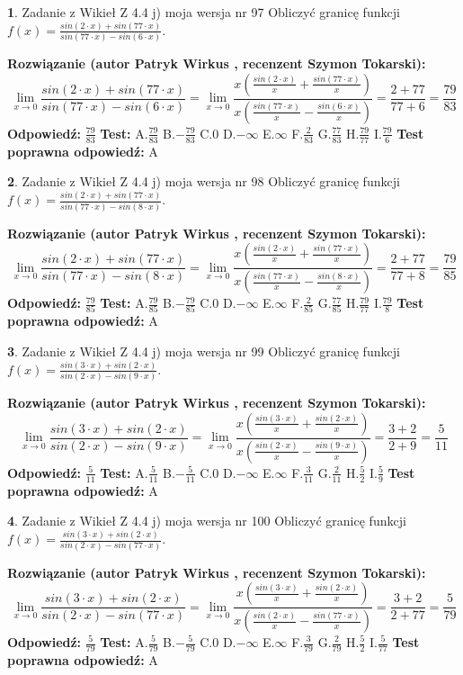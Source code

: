 \documentclass[12pt, a4paper]{article}
\theoremstyle{definition} %
\newtheorem{zad}{}
\newcommand{\zadStart}[1]{\begin{zad}#1\newline}
\newcommand{\zadStop}{\end{zad}}
\newcommand{\rozwStart}[2]{\noindent \textbf{Rozwiązanie (autor #1 , recenzent #2): }\newline}
\newcommand{\rozwStop}{\newline}
\newcommand{\odpStart}{\noindent \textbf{Odpowiedź:}\newline}
\newcommand{\odpStop}{\newline}
\newcommand{\testStart}{\noindent \textbf{Test:}\newline}
\newcommand{\testStop}{\newline}
\newcommand{\kluczStart}{\noindent \textbf{Test poprawna odpowiedź:}\newline}
\newcommand{\kluczStop}{\newline}
\begin{document}
\zadStart{Zadanie z Wikieł Z 4.4 j) moja wersja nr 97}
Obliczyć granicę funkcji $f(x)=\frac{sin(2\cdot x) +sin(77\cdot x)}{sin(77\cdot x) -sin(6\cdot x)}$.
\zadStop
\rozwStart{Patryk Wirkus}{Szymon Tokarski}
$$\lim\limits_{x\to 0}\frac{sin(2\cdot x) +sin(77\cdot x)}{sin(77\cdot x) -sin(6\cdot x)}=\lim\limits_{x\to 0}\frac{x(\frac{sin(2\cdot x)}{x}+\frac{sin(77\cdot x)}{x})}{x(\frac{sin(77\cdot x)}{x}-\frac{sin(6\cdot x)}{x})}=\frac{2+77}{77+6} = \frac{79}{83}$$
\rozwStop
\odpStart
$\frac{79}{83}$
\odpStop
\testStart
A.$\frac{79}{83}$
B.$-\frac{79}{83}$
C.$0$
D.$-\infty$
E.$\infty$
F.$\frac{2}{83}$
G.$\frac{77}{83}$
H.$\frac{79}{77}$
I.$\frac{79}{6}$
\testStop
\kluczStart
A
\kluczStop



\zadStart{Zadanie z Wikieł Z 4.4 j) moja wersja nr 98}
Obliczyć granicę funkcji $f(x)=\frac{sin(2\cdot x) +sin(77\cdot x)}{sin(77\cdot x) -sin(8\cdot x)}$.
\zadStop
\rozwStart{Patryk Wirkus}{Szymon Tokarski}
$$\lim\limits_{x\to 0}\frac{sin(2\cdot x) +sin(77\cdot x)}{sin(77\cdot x) -sin(8\cdot x)}=\lim\limits_{x\to 0}\frac{x(\frac{sin(2\cdot x)}{x}+\frac{sin(77\cdot x)}{x})}{x(\frac{sin(77\cdot x)}{x}-\frac{sin(8\cdot x)}{x})}=\frac{2+77}{77+8} = \frac{79}{85}$$
\rozwStop
\odpStart
$\frac{79}{85}$
\odpStop
\testStart
A.$\frac{79}{85}$
B.$-\frac{79}{85}$
C.$0$
D.$-\infty$
E.$\infty$
F.$\frac{2}{85}$
G.$\frac{77}{85}$
H.$\frac{79}{77}$
I.$\frac{79}{8}$
\testStop
\kluczStart
A
\kluczStop



\zadStart{Zadanie z Wikieł Z 4.4 j) moja wersja nr 99}
Obliczyć granicę funkcji $f(x)=\frac{sin(3\cdot x) +sin(2\cdot x)}{sin(2\cdot x) -sin(9\cdot x)}$.
\zadStop
\rozwStart{Patryk Wirkus}{Szymon Tokarski}
$$\lim\limits_{x\to 0}\frac{sin(3\cdot x) +sin(2\cdot x)}{sin(2\cdot x) -sin(9\cdot x)}=\lim\limits_{x\to 0}\frac{x(\frac{sin(3\cdot x)}{x}+\frac{sin(2\cdot x)}{x})}{x(\frac{sin(2\cdot x)}{x}-\frac{sin(9\cdot x)}{x})}=\frac{3+2}{2+9} = \frac{5}{11}$$
\rozwStop
\odpStart
$\frac{5}{11}$
\odpStop
\testStart
A.$\frac{5}{11}$
B.$-\frac{5}{11}$
C.$0$
D.$-\infty$
E.$\infty$
F.$\frac{3}{11}$
G.$\frac{2}{11}$
H.$\frac{5}{2}$
I.$\frac{5}{9}$
\testStop
\kluczStart
A
\kluczStop



\zadStart{Zadanie z Wikieł Z 4.4 j) moja wersja nr 100}
Obliczyć granicę funkcji $f(x)=\frac{sin(3\cdot x) +sin(2\cdot x)}{sin(2\cdot x) -sin(77\cdot x)}$.
\zadStop
\rozwStart{Patryk Wirkus}{Szymon Tokarski}
$$\lim\limits_{x\to 0}\frac{sin(3\cdot x) +sin(2\cdot x)}{sin(2\cdot x) -sin(77\cdot x)}=\lim\limits_{x\to 0}\frac{x(\frac{sin(3\cdot x)}{x}+\frac{sin(2\cdot x)}{x})}{x(\frac{sin(2\cdot x)}{x}-\frac{sin(77\cdot x)}{x})}=\frac{3+2}{2+77} = \frac{5}{79}$$
\rozwStop
\odpStart
$\frac{5}{79}$
\odpStop
\testStart
A.$\frac{5}{79}$
B.$-\frac{5}{79}$
C.$0$
D.$-\infty$
E.$\infty$
F.$\frac{3}{79}$
G.$\frac{2}{79}$
H.$\frac{5}{2}$
I.$\frac{5}{77}$
\testStop
\kluczStart
A
\kluczStop
\end{document}
